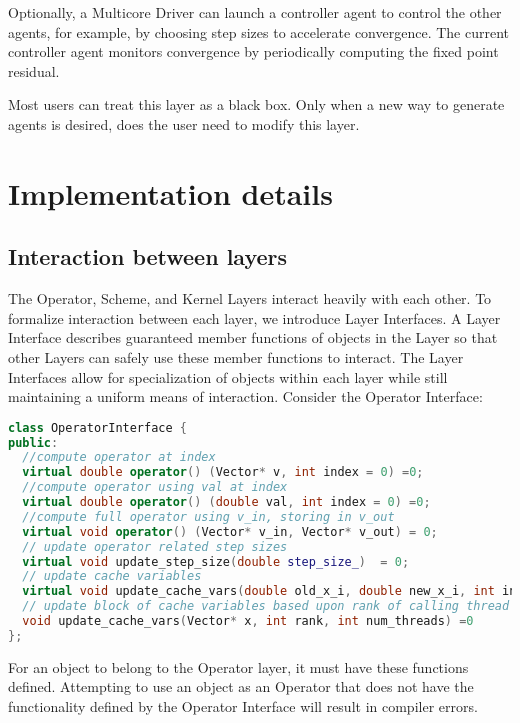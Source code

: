 Optionally, a Multicore Driver can launch a controller agent to control the other agents, for example, by choosing step sizes to accelerate convergence.
The current controller agent monitors convergence by periodically computing the fixed point residual.

Most users can treat this layer as a black box. Only when a new way to generate agents is desired, does the user need to modify this layer.

\section{Implementation details}\label{sc:implement}

\subsection{Interaction between layers} \label{sc:interface}

The Operator, Scheme, and Kernel Layers interact heavily with each other. To formalize interaction between each layer, we introduce Layer Interfaces. A Layer Interface describes guaranteed member functions of objects in the Layer so that other Layers can safely use these member functions to interact. The Layer Interfaces allow for specialization of objects within each layer while still maintaining a uniform means of interaction. Consider the Operator Interface:
\begin{lstlisting}[language=C++,label={Operator_Interface}]
class OperatorInterface {
public:
  //compute operator at index
  virtual double operator() (Vector* v, int index = 0) =0;
  //compute operator using val at index
  virtual double operator() (double val, int index = 0) =0;
  //compute full operator using v_in, storing in v_out
  virtual void operator() (Vector* v_in, Vector* v_out) = 0;
  // update operator related step sizes
  virtual void update_step_size(double step_size_)  = 0;
  // update cache variables
  virtual void update_cache_vars(double old_x_i, double new_x_i, int index) = 0;
  // update block of cache variables based upon rank of calling thread
  void update_cache_vars(Vector* x, int rank, int num_threads) =0
};
\end{lstlisting}

For an object to belong to the Operator layer, it must have these functions defined.
Attempting to use an object as an Operator that does not have the functionality defined by the Operator Interface will result in compiler errors.

